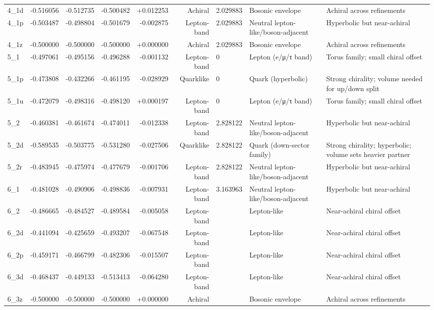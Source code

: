 \documentclass[smallextended]{svjour3}       %
\begin{document}
\begin{longtable}{lrrrrrllp{6.8cm}}
    4\_1d & -0.516056 & -0.512735 & -0.500482 & +0.012253 & Achiral & 2.029883 & Bosonic envelope & Achiral across refinements \\
    4\_1p & -0.503487 & -0.498804 & -0.501679 & -0.002875 & Lepton-band & 2.029883 & Neutral lepton-like/boson-adjacent & Hyperbolic but near-achiral \\
    4\_1z & -0.500000 & -0.500000 & -0.500000 & +0.000000 & Achiral & 2.029883 & Bosonic envelope & Achiral across refinements \\
    5\_1 & -0.497061 & -0.495156 & -0.496288 & -0.001132 & Lepton-band & 0 & Lepton (e/μ/τ band) & Torus family; small chiral offset \\
    5\_1p & -0.473808 & -0.432266 & -0.461195 & -0.028929 & Quarklike & 0 & Quark (hyperbolic) & Strong chirality; volume needed for up/down split \\
    5\_1u & -0.472079 & -0.498316 & -0.498120 & +0.000197 & Lepton-band & 0 & Lepton (e/μ/τ band) & Torus family; small chiral offset \\
    5\_2 & -0.460381 & -0.461674 & -0.474011 & -0.012338 & Lepton-band & 2.828122 & Neutral lepton-like/boson-adjacent & Hyperbolic but near-achiral \\
    5\_2d & -0.589535 & -0.503775 & -0.531280 & -0.027506 & Quarklike & 2.828122 & Quark (down-sector family) & Strong chirality; hyperbolic; volume sets heavier partner \\
    5\_2r & -0.483945 & -0.475974 & -0.477679 & -0.001706 & Lepton-band & 2.828122 & Neutral lepton-like/boson-adjacent & Hyperbolic but near-achiral \\
    6\_1 & -0.481028 & -0.490906 & -0.498836 & -0.007931 & Lepton-band & 3.163963 & Neutral lepton-like/boson-adjacent & Hyperbolic but near-achiral \\
    6\_2 & -0.486665 & -0.484527 & -0.489584 & -0.005058 & Lepton-band &  & Lepton-like & Near-achiral chiral offset \\
    6\_2d & -0.441094 & -0.425659 & -0.493207 & -0.067548 & Lepton-band &  & Lepton-like & Near-achiral chiral offset \\
    6\_2p & -0.459171 & -0.466799 & -0.482306 & -0.015507 & Lepton-band &  & Lepton-like & Near-achiral chiral offset \\
    6\_3d & -0.468437 & -0.449133 & -0.513413 & -0.064280 & Lepton-band &  & Lepton-like & Near-achiral chiral offset \\
    6\_3z & -0.500000 & -0.500000 & -0.500000 & +0.000000 & Achiral &  & Bosonic envelope & Achiral across refinements \\

\end{longtable}
\end{document}
